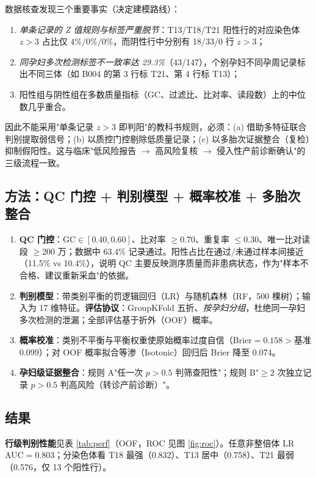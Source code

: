 \documentclass[11pt,a4paper]{ctexart}
\begin{document}
数据核查发现三个重要事实（决定建模路线）：
\begin{enumerate}
\item \emph{单条记录的 Z 值规则与标签严重脱节}：T13/T18/T21 阳性行的对应染色体 $z>3$ 占比仅 $4\%/0\%/0\%$，而阴性行中分别有 18/33/0 行 $z>3$；
\item \emph{同孕妇多次检测标签不一致率达 29.3\%}（43/147），个别孕妇不同孕周记录标出不同三体（如 B004 的第 3 行标 T21、第 4 行标 T13）；
\item 阳性组与阴性组在多数质量指标（GC、过滤比、比对率、读段数）上的中位数几乎重合。
\end{enumerate}

因此不能采用"单条记录 $z>3$ 即判阳"的教科书规则，必须：(a) 借助多特征联合判别提取弱信号；(b) 以质控门控剔除低质量记录；(c) 以多胎次证据整合（复检）抑制假阳性。这与临床"低风险报告 $\to$ 高风险复核 $\to$ 侵入性产前诊断确认"的三级流程一致。

\subsection{方法：QC 门控 + 判别模型 + 概率校准 + 多胎次整合}
\begin{enumerate}
\item \textbf{QC 门控}：GC$\in[0.40,0.60]$、比对率 $\ge0.70$、重复率 $\le0.30$、唯一比对读段 $\ge200$ 万；数据中 63.4\% 记录通过。阳性占比在通过/未通过样本间接近（11.5\% vs 10.4\%），说明 QC 主要反映测序质量而非患病状态，作为"样本不合格、建议重新采血"的依据。
\item \textbf{判别模型}：带类别平衡的罚逻辑回归（LR）与随机森林（RF，500 棵树）；输入为 17 维特征。\textbf{评估协议}：GroupKFold 五折、\emph{按孕妇分组}，杜绝同一孕妇多次检测的泄漏；全部评估基于折外（OOF）概率。
\item \textbf{概率校准}：类别不平衡与平衡权重使原始概率过度自信（Brier$=0.158>$基准 0.099）；对 OOF 概率拟合等渗（Isotonic）回归后 Brier 降至 0.074。
\item \textbf{孕妇级证据整合}：规则 A"任一次 $p>0.5$ 判筛查阳性"；规则 B"$\ge2$ 次独立记录 $p>0.5$ 判高风险（转诊产前诊断）"。
\end{enumerate}

\subsection{结果}
\textbf{行级判别性能}见表 \ref{tab:perf}（OOF，ROC 见图 \ref{fig:roc}）。任意非整倍体 LR AUC$=0.803$；分染色体看 T18 最强（0.832）、T13 居中（0.758）、T21 最弱（0.576，仅 13 个阳性行）。
\end{document}
